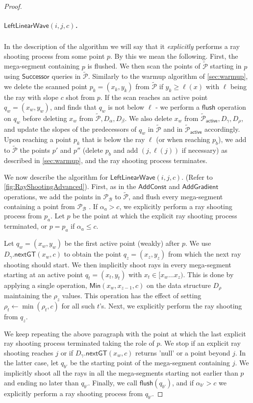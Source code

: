 \documentclass[a4paper,UKenglish,cleveref, autoref, thm-restate]{lipics-v2021}
\newcommand{\AC}{\mathsf{AddConst}}
\newcommand{\AG}{\mathsf{AddGradient}}
\newcommand{\LLW}{\mathsf{LeftLinearWave}}
\newcommand{\assign}{\leftarrow}
\newcommand{\local}{\text{short }}
\newcommand{\longrange}{\text{long }}
\newcommand{\addmin}{\text{Add-min }}
\newcommand{\Successor}{\mathsf{Successor}}
\newcommand{\Min}{\mathsf{Min}}
\newcommand{\nextGT}{\mathsf{nextGT}}
\renewcommand{\P}{\mathcal{P}}
\newcommand{\TAP}{\tilde{\P}_{\mathsf{active}}}
\newcommand{\DAL}{D_{\alpha}}
\newcommand{\DGAM}{D_{\gamma}}
\newcommand{\TP}{\tilde{\P}}
\newcommand{\para}[1]{\vspace{-0.1in} \subparagraph*{#1}}
\newcommand{\B}{\mathcal{B}}
\newcommand{\rl}[1]{\rho_{#1}}
\newcommand{\flush}{\mathsf{flush}}
\begin{document}
\begin{proof}
\para{$\LLW(i,j,c)$.}
In the description of the algorithm we will say that it \textit{explicitly} performs a ray shooting process from some point $p$. 
By this we mean the following.
First, the mega-segment containing $p$ is flushed.
We then scan the points of $\TP$ starting in $p$ using $\Successor$ queries in $\TP$.
Similarly to the warmup algorithm of \cref{sec:warmup}, we delete the scanned point $p_k=(x_k,y_k)$ from $\TP$ if $y_k \ge \ell(x)$ with $\ell$ being the ray with slope $c$ shot from $p$.
If the scan reaches an active point $q_w = (x_w,y_w)$, and finds that $q_w$ is not below $\ell$ - we perform a $\flush$ operation on $q_w$ before deleting $x_w$ from $\TP, \DAL, D_\beta$.
We also delete $x_w$ from $\TAP, \DGAM, D_\rho$, and update the slopes of the predecessors of $q_w$ in $\TP$ and in $\TAP$ accordingly.
Upon reaching a point $p_k$ that is below the ray $\ell$ (or when reaching $p_b$), we add to $\TP$ the points $p'$ and $p''$ (delete $p_b$ and add $(j,\ell(j))$ if necessary) as described in \cref{sec:warmup}, and the ray shooting process terminates.

We now describe the algorithm for $\LLW(i,j,c)$. (Refer to  \cref{fig:RayShootingAdvanced}).
First, as in the $\AC$ and $\AG$ operations,  we add the points in $\P_{\B}$ to $\TP$, and flush every mega-segment containing a point from $\P_{\B}$ .
If $\alpha_a > c$, we explicitly perform a ray shooting process from $p_a$.
Let $p$ be the point at which the explicit ray shooting process terminated, or $p=p_a$ if $\alpha_a \le c$.

Let $q_{w}=(x_w,y_w)$ be the first active point (weakly) after $p$. 
We use $\DGAM.\nextGT(x_w,c)$ to obtain the  point $q_z = (x_z,y_z)$ from which the next \longrange ray shooting should start.
We then implicitly shoot \local rays in 
every mega-segment starting at an active point $q_t=(x_t,y_t)$ with $x_t\in [x_w \ldots x_z)$. This is done by applying a single  operation, $\Min(x_w,x_{z-1},c)$ on the \addmin data structure $D_\rho$ maintaining the $\rl{z}$ values.
This operation has the effect of setting  $\rl{t} \assign \min(\rl{t},c)$ for all such $t$'s. Next, we explicitly perform the \longrange  ray shooting from $q_z$.

 We keep repeating the above paragraph with the point at which the last explicit \longrange ray shooting process terminated taking the role of $p$.
We stop if an explicit ray shooting reaches $j$ or if $\DGAM.\nextGT(x_w,c)$ returns 'null' or a point beyond $j$. In the latter case, let $q_{b'}$ be the starting point of the mega-segment containing $j$. We  implicitly shoot all the \local rays in all the mega-segments starting not earlier than $p$ and ending no later than $q_{b'}$. Finally, we call $\flush(q_{b'})$, and if $\alpha_{b'} > c$ we explicitly perform a ray shooting process from $q_{b'}$.


\end{proof}
\end{document}
